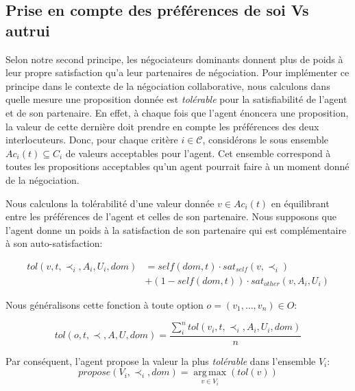 	

	
	
	\subsection {Prise en compte des préférences de soi Vs autrui}
	Selon notre second principe, les négociateurs dominants donnent plus de poids à leur propre satisfaction qu'a leur partenaires de négociation. 
	Pour implémenter ce principe dans le contexte de la négociation collaborative, nous calculons dans quelle mesure une proposition donnée est \emph{tolérable} pour la satisfiabilité de l'agent et de son partenaire.
	En effet, à chaque fois que l'agent énoncera une proposition, la valeur de cette dernière doit prendre en compte les préférences des deux interlocuteurs. 
	Donc, pour chaque critère $i\in \mathcal{C}$, considérons le sous ensemble $Ac_i(t)\subseteq C_i$ de valeurs acceptables pour l'agent.
	Cet ensemble correspond à toutes les propositions acceptables qu'un agent pourrait faire à un moment donné de la négociation.
	
	Nous calculons la tolérabilité d'une valeur donnée $ v \in Ac_i(t) $ en équilibrant entre les préférences de l'agent et celles de son partenaire. Nous supposons que l'agent donne un poids à la satisfaction de son partenaire qui est complémentaire à son auto-satisfaction:
	
	\begin{equation}
	\begin{split}
	tol(v, t, \prec_i, A_i, U_i, dom) & = self(dom, t)  \cdot sat_{self}(v, \prec_i) \\
	& +  (1 - self(dom, t)) \cdot sat_{other}(v, A_i, U_i)
	\end{split} 
	\end{equation}
	

	Nous généralisons cette fonction à toute option 
	$o = (v_1,\ldots,v_n) \in O$:
	
	\begin{equation}
	tol(o, t, \prec, A, U, dom) = \frac{ \sum_{i}^{n} tol(v_i, t, \prec_i, A_i, U_i, dom) } {n}
	\end{equation}
	
	\noindent
	Par conséquent, l'agent propose la valeur la plus \emph{tolérable} dans l'ensemble $V_i$:
	\begin{equation}
	propose(V_i, \prec_i,dom) =  \operatorname*{arg\,max}_{v \in V_i} ( tol(v))
	\end{equation}
	
